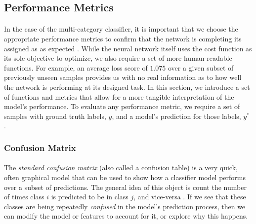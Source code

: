 \documentclass[12pt,letterpaper]{article}
\begin{document}

\subsection{Performance Metrics}

\paragraph*{}In the case of the multi-category classifier, it is important that we choose the appropriate performance metrics to confirm that the network is completing its assigned as as expected \cite{Geron}. While the neural network itself uses the cost function as its sole objective to optimize, we also require a set of more human-readable functions. For example, an average loss score of $1.075$ over a given subset of previously unseen samples provides us with no real information as to how well the network is performing at its designed task. In this section, we introduce a set of functions and metrics that allow for a more tangible interpretation of the model's performance. To evaluate any performance metric, we require a set of samples with ground truth labels, $y$, and a model's prediction for those labels, $y^*$ \cite{Goodfellow,James}.


\subsubsection{Confusion Matrix}

\paragraph*{}The \textit{standard confusion matrix} (also called a confusion table) is a very quick, often graphical model that can be used to show how a classifier model performs over a subset of predictions. The general idea of this object is count the number of times class $i$ is predicted to be in class $j$, and vice-versa \cite{Geron}. If we see that these classes are being repeatedly \textit{confused} in the model's prediction process, then we can modify the model or features to account for it, or explore why this happens.
\end{document}
